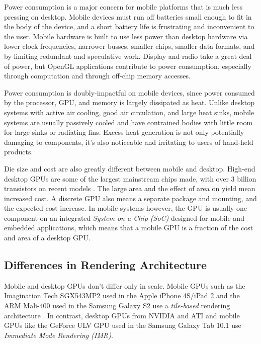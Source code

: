 Power consumption is a major concern for mobile platforms that is much less
pressing on desktop.  Mobile devices must run off batteries small enough to fit
in the body of the device, and a short battery life is frustrating and
inconvenient to the user.  Mobile hardware is built to use less power than
desktop hardware via lower clock frequencies, narrower busses, smaller chips,
smaller data formats, and by limiting redundant and speculative work.  Display
and radio take a great deal of power, but OpenGL applications contribute to
power consumption, especially through computation and through off-chip memory
accesses.

Power consumption is doubly-impactful on mobile devices, since power consumed
by the processor, GPU, and memory is largely dissipated as heat.  Unlike
desktop systems with active air cooling, good air circulation, and large heat
sinks, mobile systems are usually passively cooled and have
 contrained bodies
with little room for large sinks or radiating fins.  Excess
 heat generation
is not only potentially damaging to components, it's also
 noticeable and
irritating to users of hand-held products.

Die size and cost are also greatly different between mobile and desktop.
High-end desktop GPUs are some of the largest mainstream chips made, with over
3 billion transistors on recent models \cite{Walton10}.  The large area
and the effect of area on yield mean increased cost.  A discrete GPU also means
a separate package and mounting, and the expected cost increase.  In mobile
systems however, the GPU is usually one component on an integrated
\textit{System on a Chip (SoC)} designed for mobile and embedded applications,
which means that a mobile GPU is a fraction of the cost and area of a desktop
GPU.

\subsection{Differences in Rendering Architecture}
\label{Jon-McCaffrey:differences-in-rendering-architecture}
  Mobile and desktop GPUs don't
differ only in scale.  Mobile GPUs such as the Imagination Tech SGX543MP2 used
in the Apple iPhone 4S/iPad 2 and the ARM Mali-400 used in the Samsung Galaxy S2
use a \textit{tile-based} rendering architecture \cite{Klug11a}.  In
contrast, desktop GPUs from NVIDIA and ATI and mobile GPUs like the
GeForce ULV GPU used in the Samsung Galaxy Tab 10.1 use \textit{Immediate Mode
Rendering (IMR)}.

